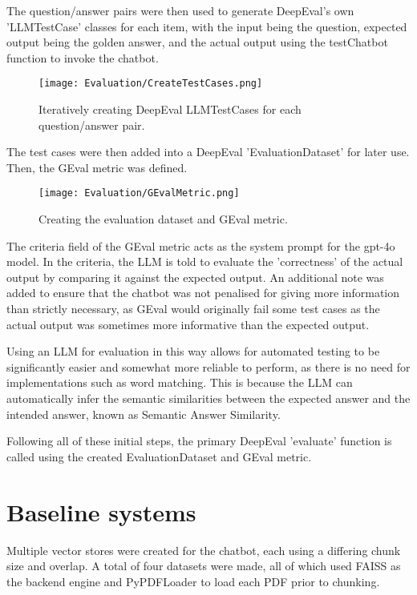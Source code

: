 \noindent The question/answer pairs were then used to generate DeepEval's own 'LLMTestCase' classes for each item, 
with the input being the question, expected output being the golden answer, and the actual output using the 
testChatbot function to invoke the chatbot.

\begin{figure}[H]
    \centering
    \texttt{[image: Evaluation/CreateTestCases.png]}
    \caption{Iteratively creating DeepEval LLMTestCases for each question/answer pair. \label{fig:CreateTestCases}}
\end{figure}

\para The test cases were then added into a DeepEval 'EvaluationDataset' for later use. Then, the GEval metric was defined.

\begin{figure}[H]
    \centering
    \texttt{[image: Evaluation/GEvalMetric.png]}
    \caption{Creating the evaluation dataset and GEval metric. \label{fig:GEvalAndDataset}}
\end{figure}

\noindent The criteria field of the GEval metric acts as the system prompt for the gpt-4o model. In the criteria, the LLM is told 
to evaluate the 'correctness' of the actual output by comparing it against the expected output. An additional note was added to ensure 
that the chatbot was not penalised for giving more information than strictly necessary, as GEval would originally fail some test cases 
as the actual output was sometimes more informative than the expected output.

\para Using an LLM for evaluation in this way allows for automated testing to be significantly easier and somewhat more reliable to 
perform, as there is no need for implementations such as word matching. This is because the LLM can automatically infer the semantic 
similarities between the expected answer and the intended answer, known as Semantic Answer Similarity. 

\para Following all of these initial steps, the primary DeepEval 'evaluate' function is called using the created EvaluationDataset
and GEval metric. 

\section{Baseline systems}
Multiple vector stores were created for the chatbot, each using a differing chunk size and overlap. A total of four datasets were 
made, all of which used FAISS as the backend engine and PyPDFLoader to load each PDF prior to chunking. 

